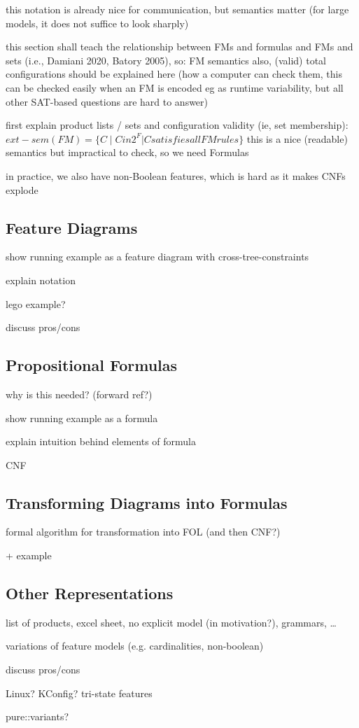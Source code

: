 this notation is already nice for communication, but semantics matter (for large models, it does not suffice to look sharply)

this section shall teach the relationship between FMs and formulas and FMs and sets (i.e., Damiani 2020, Batory 2005), so: FM semantics
also, (valid) total configurations should be explained here (how a computer can check them, this can be checked easily when an FM is encoded eg as runtime variability, but all other SAT-based questions are hard to answer)

first explain product lists / sets and configuration validity (ie, set membership):
$ext-sem (FM) = \{ C \mid C in 2^F | C satisfies all FM rules \}$
this is a nice (readable) semantics but impractical to check, so we need Formulas


in practice, we also have non-Boolean features, which is hard as it makes CNFs explode





\subsection{Feature Diagrams}

show running example as a feature diagram with cross-tree-constraints

explain notation

lego example?

discuss pros/cons

\subsection{Propositional Formulas}

why is this needed? (forward ref?)

show running example as a formula

explain intuition behind elements of formula

CNF

\subsection{Transforming Diagrams into Formulas}

formal algorithm for transformation into FOL (and then CNF?)

+ example

\subsection{Other Representations}

list of products, excel sheet, no explicit model (in motivation?), grammars, \dots

variations of feature models (e.g. cardinalities, non-boolean)

discuss pros/cons

Linux? KConfig? tri-state features

pure::variants?